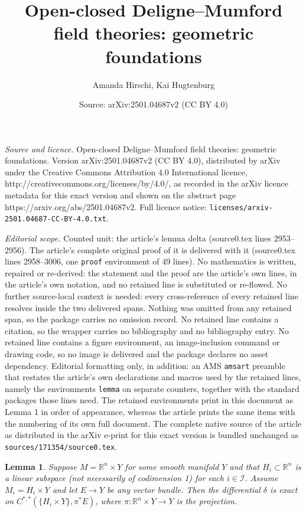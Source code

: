 \documentclass[10pt,a4paper]{amsart}
\title{Open-closed Deligne--Mumford field theories: geometric foundations}
\author{Amanda Hirschi, Kai Hugtenburg}
\date{Source: arXiv:2501.04687v2 (CC BY 4.0)}
\newtheorem{lemma}{Lemma}
\newcommand{\bR}{\mathbb{R}}
\newcommand{\cI}{\mathcal{I}}
\newcommand{\cl}{\colon}
\begin{document}
\maketitle

\noindent\emph{Source and licence.} Open-closed Deligne--Mumford field theories: geometric foundations. Version arXiv:2501.04687v2 (CC BY 4.0), distributed by arXiv under the Creative Commons Attribution 4.0 International licence, http://creativecommons.org/licenses/by/4.0/, as recorded in the arXiv licence metadata for this exact version and shown on the abstract page https://arxiv.org/abs/2501.04687v2. Full licence notice: \texttt{licenses/arxiv-2501.04687-CC-BY-4.0.txt}.\par\smallskip

\noindent\textit{Editorial scope.} Counted unit: the article's lemma delta (source0.tex lines 2953--2956). The article's complete original proof of it is delivered with it (source0.tex lines 2958--3006, one \texttt{proof} environment of 49 lines). No mathematics is written, repaired or re-derived: the statement and the proof are the article's own lines, in the article's own notation, and no retained line is substituted or re-flowed.  No further source-local context is needed: every cross-reference of every retained line resolves inside the two delivered spans.  Nothing was omitted from any retained span, so the package carries no omission record.  No retained line contains a citation, so the wrapper carries no bibliography and no bibliography entry.  No retained line contains a figure environment, an image-inclusion command or drawing code, so no image is delivered and the package declares no asset dependency.  Editorial formatting only, in addition: an AMS \texttt{amsart} preamble that restates the article's own declarations and macros used by the retained lines, namely the environments \texttt{lemma} on separate counters, together with the standard packages those lines need.  The retained environments print in this document as Lemma 1 in order of appearance, whereas the article prints the same items with the numbering of its own full document.  The complete native source of the article as distributed in the arXiv e-print for this exact version is bundled unchanged as \texttt{sources/171354/source0.tex}.
\begin{lemma}
	\label{lem:local exactness of delta}
	Suppose $M = \bR^n \times Y$ for some smooth manifold $Y$ and that $H_i \subset \bR^n$ is a linear subspace (not necessarily of codimension 1) for each $i\in\cI$. Assume $M_i = H_i \times Y$ and let $E \rightarrow Y$ be any vector bundle. Then the differential $\delta$ is exact on $C^{*,*}(\{H_i \times Y\}, \pi^*E)$, where $\pi\cl  \bR^n \times Y \rightarrow Y$ is the projection.
\end{lemma}
\end{document}
